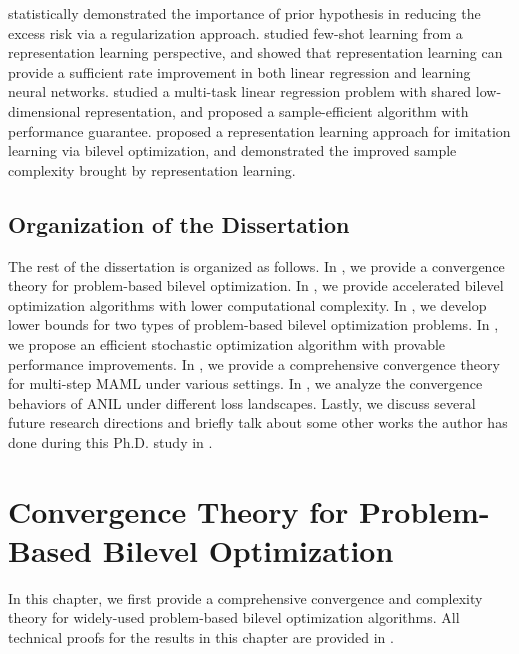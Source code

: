 \documentclass{osudissert96}
\begin{document}
\vspace{0.2cm}

\cite{zhou2019efficient} statistically demonstrated the importance of prior hypothesis in reducing the excess risk via a regularization approach.  
\cite{du2020few} studied few-shot learning from a representation learning perspective, and showed that representation learning can provide a sufficient rate improvement in both linear regression and learning neural networks. \cite{tripuraneni2020provable} studied a multi-task linear regression problem with shared low-dimensional representation, and proposed a sample-efficient algorithm with performance guarantee. \cite{arora2020provable} proposed a representation learning approach for imitation learning via bilevel optimization, and demonstrated the improved sample complexity brought by representation learning. 


\section{Organization of the Dissertation}
The rest of the dissertation is organized as follows. In , we provide a convergence theory for problem-based bilevel optimization. In , we provide accelerated bilevel optimization algorithms with lower computational complexity.  In , we develop lower bounds for two types of problem-based bilevel optimization problems. In , we propose an efficient stochastic optimization algorithm with provable performance improvements.  In , we provide a comprehensive convergence theory for multi-step MAML under various settings. In , we analyze the convergence behaviors of ANIL under different loss landscapes. Lastly, we discuss several future research directions and briefly talk about some other works the author has done during this Ph.D. study in . 
  
\chapter{Convergence Theory for Problem-Based Bilevel Optimization}\label{chp_deter_bilevel}
In this chapter, we first provide a comprehensive convergence and complexity theory for widely-used problem-based bilevel optimization algorithms. All technical proofs for the results in this chapter are provided in . 
\end{document}

